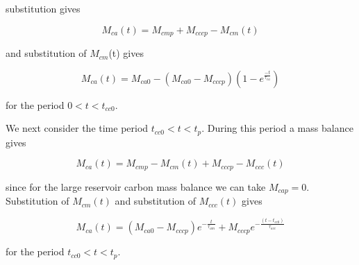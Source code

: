 substitution gives 

\begin{equation}
    M_{ca}(t) = M_{cmp} + M_{cccp} - M_{cm}(t)
\end{equation}

and substitution of $M_{cm}$(t) gives

\begin{equation}
    M_{ca}(t) = M_{ca0} - (M_{ca0} - M_{cccp})(1 - e^{\frac{-t}{\tau_{ca}}})
\end{equation}

for the period $0 < t < t_{cc0}$.

We next consider the time period $t_{cc0} < t < t_{p}$. During this period a mass balance gives

\begin{equation}
    M_{ca}(t) = M_{cmp} - M_{cm} (t) + M_{cccp} - M_{ccc} (t)
\end{equation}

since for the large reservoir carbon mass balance we can take $M_{cap} = 0$. Substitution of $M_{cm}(t)$ and substitution of $M_{ccc}(t)$ gives

\begin{equation}
    M_{ca}(t) = (M_{ca0} - M_{cccp})e^{-\frac{t}{\tau_{am}}} + M_{cccp} e^{-\frac{(t-t_{cc0})}{\tau_{acc}}}
\end{equation}

for the period $t_{cc0} < t < t_p$.


